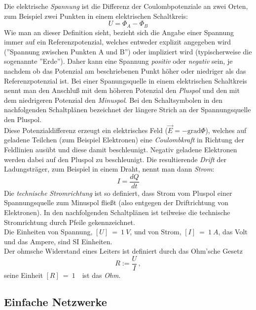 Die elektrische \textit{Spannung} ist die Differenz der Coulombpotenziale an zwei Orten, zum Beispiel zwei Punkten in einem elektrischen Schaltkreis:
\begin{equation}
	U = \Phi_A - \Phi_B
\end{equation}
Wie man an dieser Definition sieht, bezieht sich die Angabe einer Spannung immer auf ein Referenzpotenzial, welches entweder explizit angegeben wird (''Spannung zwischen Punkten A und B'') oder impliziert wird (typischerweise die sogenannte ''Erde''). Daher kann eine Spannung \textit{positiv} oder \textit{negativ} sein, je nachdem ob das Potenzial am beschriebenen Punkt höher oder niedriger als das Referenzpotenzial ist. Bei einer Spanungsquelle in einem elektrischen Schaltkreis nennt man den Anschluß mit dem höheren Potenzial den \textit{Pluspol} und den mit dem niedrigeren Potenzial den \textit{Minuspol}. Bei den Schaltsymbolen in den nachfolgenden Schaltplänen bezeichnet der längere Strich an der Spannungsquelle den Pluspol.\\
Diese Potenzialdifferenz erzeugt ein elektrisches Feld ($\vec{E} = -\mathrm{grad}\Phi$), welches auf geladene Teilchen (zum Beispiel Elektronen) eine \textit{Coulombkraft} in Richtung der Feldlinien ausübt und diese damit beschleunigt. Negativ geladene Elektronen werden dabei auf den Pluspol zu beschleunigt. Die resultierende \textit{Drift} der Ladungsträger, zum Beispiel in einem Draht, nennt man dann \textit{Strom}:
\begin{equation}
	I = \frac{dQ}{dt}
\end{equation}
Die \textit{technische Stromrichtung} ist so definiert, dass Strom vom Pluspol einer Spannungsquelle zum Minuspol fließt (also entgegen der Driftrichtung von Elektronen). In den nachfolgenden Schaltplänen ist teilweise die technische Stromrichtung durch Pfeile gekennzeichnet.\\

\noindent
Die Einheiten von Spannung, $[U]~=~1~V$, und von Strom, $[I]~=~1~A$, das Volt und das Ampere, sind SI Einheiten. \\

\noindent
Der ohmsche Widerstand eines Leiters ist definiert durch das Ohm'sche Gesetz
\begin{equation}
R:=\frac{U}{I}\, ,
\end{equation}
seine Einheit $[R]~=~1$~\Ohm\, ist das \textit{Ohm}.

\subsection{Einfache Netzwerke}

